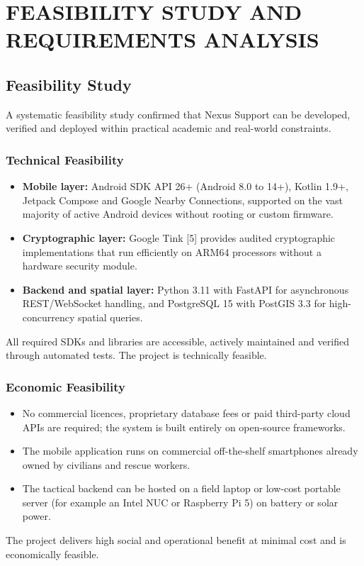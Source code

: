 \documentclass[12pt,a4paper]{report}
\begin{document}
\chapter{FEASIBILITY STUDY AND REQUIREMENTS ANALYSIS}

\section{Feasibility Study}
A systematic feasibility study confirmed that Nexus Support can be developed, verified and deployed within practical academic and real-world constraints.

\subsection{Technical Feasibility}
\begin{itemize}
    \item \textbf{Mobile layer:} Android SDK API 26+ (Android 8.0 to 14+), Kotlin 1.9+, Jetpack Compose and Google Nearby Connections, supported on the vast majority of active Android devices without rooting or custom firmware.
    \item \textbf{Cryptographic layer:} Google Tink [5] provides audited cryptographic implementations that run efficiently on ARM64 processors without a hardware security module.
    \item \textbf{Backend and spatial layer:} Python 3.11 with FastAPI for asynchronous REST/WebSocket handling, and PostgreSQL 15 with PostGIS 3.3 for high-concurrency spatial queries.
\end{itemize}
All required SDKs and libraries are accessible, actively maintained and verified through automated tests. The project is technically feasible.

\subsection{Economic Feasibility}
\begin{itemize}
    \item No commercial licences, proprietary database fees or paid third-party cloud APIs are required; the system is built entirely on open-source frameworks.
    \item The mobile application runs on commercial off-the-shelf smartphones already owned by civilians and rescue workers.
    \item The tactical backend can be hosted on a field laptop or low-cost portable server (for example an Intel NUC or Raspberry Pi 5) on battery or solar power.
\end{itemize}
The project delivers high social and operational benefit at minimal cost and is economically feasible.
\end{document}
